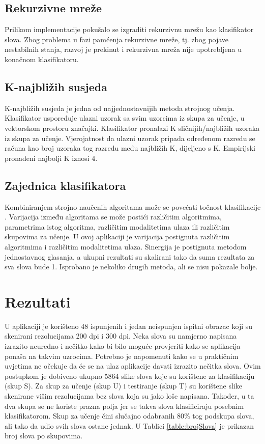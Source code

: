 \documentclass[a4paper,twocolumn,dvipdfm]{article}
\begin{document}
\subsection{Rekurzivne mreže}
Prilikom implementacije pokušalo se izgraditi rekurzivnu mrežu kao klasifikator slova. 
Zbog problema u fazi pamćenja rekurzivne mreže, tj. zbog pojave nestabilnih stanja, 
razvoj je prekinut i rekurzivna mreža nije upotrebljena u konačnom klasifikatoru.

\subsection{K-najbližih susjeda}
K-najbližih susjeda je jedna od najjednostavnijih metoda strojnog učenja. 
Klasifikator uspoređuje ulazni uzorak sa svim uzorcima iz skupa za učenje, 
u vektorskom prostoru značajki. Klasifikator pronalazi K sličnijih/najbližih 
uzoraka iz skupa za učenje. Vjerojatnost da ulazni uzorak pripada određenom 
razredu se računa kao broj uzoraka tog razredu među najbližih K, dijeljeno s K. 
Empirijski pronađeni najbolji K iznosi 4.

\subsection{Zajednica klasifikatora}
Kombiniranjem strojno naučenih algoritama može se povećati točnost
klasifikacije \cite{alpaydin2004introduction}. Varijacija između algoritama se
može postići različitim algoritmima, parametrima istog algoritma, različitim
modalitetima ulaza ili različitim skupovima za učenje. U ovoj aplikaciji je
varijacija postignuta različitim algoritmima i različitim modalitetima ulaza.
Sinergija je postignuta metodom jednostavnog glasanja, a ukupni rezultati su
skalirani tako da suma rezultata za sva slova bude 1. Isprobano je nekoliko
drugih metoda, ali se nisu pokazale bolje.

\section{Rezultati}
U aplikaciji je korišteno 48 ispunjenih i jedan neispunjen ispitni obrazac koji
su skenirani rezolucijama 200 dpi i 300 dpi. Neka slova su namjerno napisana
izrazito neuredno i nečitko kako bi bilo moguće provjeriti kako se aplikacija
ponaša na takvim uzrocima. Potrebno je napomenuti kako se u praktičnim uvjetima
ne očekuje da će se na ulaz aplikacije davati izrazito nečitka slova. Ovim
postupkom je dobiveno ukupno 5864 slike slova koje su korištene za klasifikaciju
(skup S). Za skup za učenje (skup U) i testiranje (skup T) su korištene slike
skenirane višim rezolucijama bez slova koja su jako loše napisana. Također,
u ta dva skupa se ne koriste prazna polja jer se takva slova klasificiraju
posebnim klasifikatorom. Skup za učenje čini slučajno odabranih 80\% tog
podskupa slova, ali tako da udio svih slova ostane jednak. U Tablici
\ref{table:brojSlova} je prikazan broj slova po skupovima.
\end{document}
